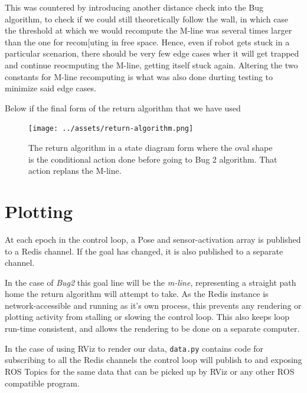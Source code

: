 \documentclass[11pt, a4paper]{article}
\begin{document}
This was countered by introducing another distance check into the Bug algorithm, to check if we could still 
theoretically follow the wall, in which case the threshold at which we would recompute the M-line was several 
times larger than the one for recom[uting in free space. Hence, even if robot gets stuck in a particular scenarion, 
there should be very few edge cases wher it will get trapped and continue reocmputing the M-line, getting itself stuck again.
Altering the two constants for M-line recomputing is what was also done durting testing to minimize said edge cases.


Below if the final form of the return algorithm that we have used

\begin{figure}[H]
  \begin{center}
    \texttt{[image: ../assets/return-algorithm.png]}
    \caption{The return algorithm in a state diagram form where the oval shape is the conditional action done before going to Bug 2 algorithm. That action replans the M-line.}
  \end{center}
\end{figure} 



\section{Plotting}
\label{Plotting}

At each epoch in the control loop, a Pose and sensor-activation array is published to a Redis channel.
If the goal has changed, it is also published to a separate channel. 


In the case of \textit{Bug2} this goal line will be the \textit{m-line}, representing a 
straight path home the return algorithm will attempt to take. As the Redis instance is network-accessible 
and running as it's own process, this prevents any rendering or plotting activity from stalling or 
slowing the control loop. This also keeps loop run-time consistent, and allows the rendering to
be done on a separate computer.

In the case of using RViz to render our data, \texttt{data.py} contains code for 
subscribing to all the Redis channels the control loop will publish to and exposing 
ROS Topics for the same data that can be picked up by RViz or any other ROS compatible 
program.
\end{document}
